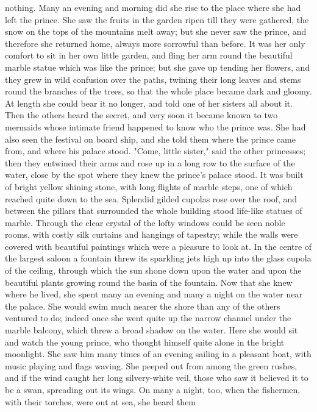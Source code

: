 nothing. Many an evening and morning did she rise to the place where
she had left the prince. She saw the fruits in the garden ripen till
they were gathered, the snow on the tops of the mountains melt away;
but she never saw the prince, and therefore she returned home,
always more sorrowful than before. It was her only comfort to sit in
her own little garden, and fling her arm round the beautiful marble
statue which was like the prince; but she gave up tending her flowers,
and they grew in wild confusion over the paths, twining their long
leaves and stems round the branches of the trees, so that the whole
place became dark and gloomy. At length she could bear it no longer,
and told one of her sisters all about it. Then the others heard the
secret, and very soon it became known to two mermaids whose intimate
friend happened to know who the prince was. She had also seen the
festival on board ship, and she told them where the prince came
from, and where his palace stood.
    "Come, little sister," said the other princesses; then they
entwined their arms and rose up in a long row to the surface of the
water, close by the spot where they knew the prince's palace stood. It
was built of bright yellow shining stone, with long flights of
marble steps, one of which reached quite down to the sea. Splendid
gilded cupolas rose over the roof, and between the pillars that
surrounded the whole building stood life-like statues of marble.
Through the clear crystal of the lofty windows could be seen noble
rooms, with costly silk curtains and hangings of tapestry; while the
walls were covered with beautiful paintings which were a pleasure to
look at. In the centre of the largest saloon a fountain threw its
sparkling jets high up into the glass cupola of the ceiling, through
which the sun shone down upon the water and upon the beautiful
plants growing round the basin of the fountain. Now that she knew
where he lived, she spent many an evening and many a night on the
water near the palace. She would swim much nearer the shore than any
of the others ventured to do; indeed once she went quite up the narrow
channel under the marble balcony, which threw a broad shadow on the
water. Here she would sit and watch the young prince, who thought
himself quite alone in the bright moonlight. She saw him many times of
an evening sailing in a pleasant boat, with music playing and flags
waving. She peeped out from among the green rushes, and if the wind
caught her long silvery-white veil, those who saw it believed it to be
a swan, spreading out its wings. On many a night, too, when the
fishermen, with their torches, were out at sea, she heard them
